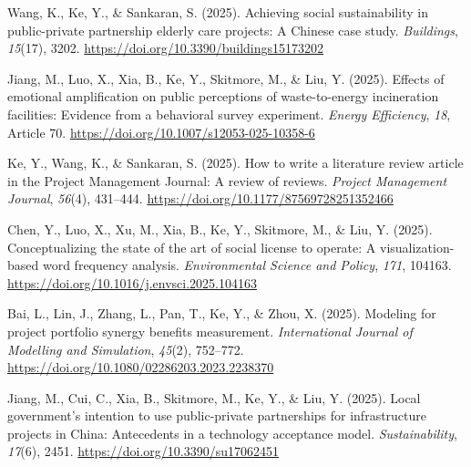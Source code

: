 \documentclass[11pt,a4paper]{report} %
\begin{document}
\begin{tablist}
        \item[2025] \tab{}Wang, K., Ke, Y., \& Sankaran, S. (2025). Achieving social sustainability in public-private partnership elderly care projects: A Chinese case study. \textit{Buildings}, \textit{15}(17), 3202. \href{https://doi.org/10.3390/buildings15173202}{https://doi.org/10.3390/buildings15173202}

        \item[2025] \tab{}Jiang, M., Luo, X., Xia, B., Ke, Y., Skitmore, M., \& Liu, Y. (2025). Effects of emotional amplification on public perceptions of waste-to-energy incineration facilities: Evidence from a behavioral survey experiment. \textit{Energy Efficiency}, \textit{18}, Article 70. \href{https://doi.org/10.1007/s12053-025-10358-6}{https://doi.org/10.1007/s12053-025-10358-6}

        \item[2025] \tab{}Ke, Y., Wang, K., \& Sankaran, S. (2025). How to write a literature review article in the Project Management Journal: A review of reviews. \textit{Project Management Journal}, \textit{56}(4), 431--444. \href{https://doi.org/10.1177/87569728251352466}{https://doi.org/10.1177/87569728251352466}

        \item[2025] \tab{}Chen, Y., Luo, X., Xu, M., Xia, B., Ke, Y., Skitmore, M., \& Liu, Y. (2025). Conceptualizing the state of the art of social license to operate: A visualization-based word frequency analysis. \textit{Environmental Science and Policy}, \textit{171}, 104163. \href{https://doi.org/10.1016/j.envsci.2025.104163}{https://doi.org/10.1016/j.envsci.2025.104163}
        
        \item[2025] \tab{}Bai, L., Lin, J., Zhang, L., Pan, T., Ke, Y., \& Zhou, X. (2025). Modeling for project portfolio synergy benefits measurement. \textit{International Journal of Modelling and Simulation}, \textit{45}(2), 752--772. \href{https://doi.org/10.1080/02286203.2023.2238370}{https://doi.org/10.1080/02286203.2023.2238370}
        
        \item[2025] \tab{}Jiang, M., Cui, C., Xia, B., Skitmore, M., Ke, Y., \& Liu, Y. (2025). Local government's intention to use public-private partnerships for infrastructure projects in China: Antecedents in a technology acceptance model. \textit{Sustainability}, \textit{17}(6), 2451. \href{https://doi.org/10.3390/su17062451}{https://doi.org/10.3390/su17062451}
        

\end{tablist}
\end{document}
